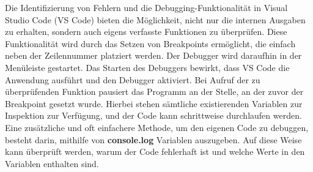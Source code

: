 Die Identifizierung von Fehlern und die Debugging-Funktionalität in Visual Studio Code (VS Code) bieten die Möglichkeit, nicht nur die internen Ausgaben zu erhalten, sondern auch eigens verfasste Funktionen zu überprüfen. Diese Funktionalität wird durch das Setzen von Breakpoints ermöglicht, die einfach neben der Zeilennummer platziert werden. Der Debugger wird daraufhin in der Menüleiste gestartet. Das Starten des Debuggers bewirkt, dass VS Code die Anwendung ausführt und den Debugger aktiviert. Bei Aufruf der zu überprüfenden Funktion pausiert das Programm an der Stelle, an der zuvor der Breakpoint gesetzt wurde. Hierbei stehen sämtliche existierenden Variablen zur Inspektion zur Verfügung, und der Code kann schrittweise durchlaufen werden.
\newline
Eine zusätzliche und oft einfachere Methode, um den eigenen Code zu debuggen, besteht darin, mithilfe von \textbf{console.log} Variablen auszugeben. Auf diese Weise kann überprüft werden, warum der Code fehlerhaft ist und welche Werte in den Variablen enthalten sind.
\cite{express_js_debugging}